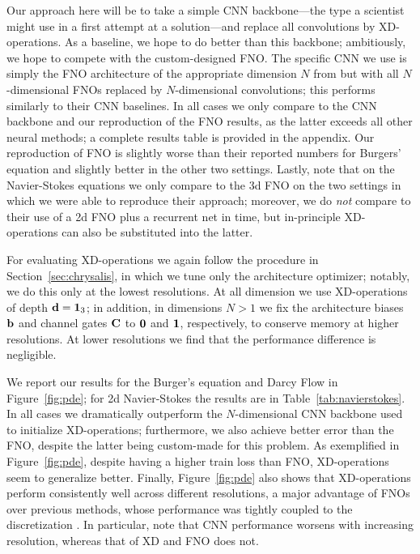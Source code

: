 
Our approach here will be to take a simple CNN backbone---the type a scientist might use in a first attempt at a solution---and replace all convolutions by XD-operations.
As a baseline, we hope to do better than this backbone;
ambitiously, we hope to compete with the custom-designed FNO.
The specific CNN we use is simply the FNO architecture of the appropriate dimension $N$ from \citet{li2021fno} but with all $N$-dimensional FNOs replaced by $N$-dimensional convolutions;
this performs similarly to their CNN baselines.
In all cases we only compare to the CNN backbone and our reproduction of the FNO results, as the latter exceeds all other neural methods;
a complete results table is provided in the appendix.
Our reproduction of FNO is slightly worse than their reported numbers for Burgers' equation and slightly better in the other two settings.
Lastly, note that on the Navier-Stokes equations we only compare to the 3d FNO on the two settings in which we were able to reproduce their approach;
moreover, we do {\em not} compare to their use of a 2d FNO plus a recurrent net in time, but in-principle XD-operations can also be substituted into the latter.

For evaluating XD-operations we again follow the procedure in Section~\ref{sec:chrysalis}, in which we tune only the architecture optimizer;
notably, we do this only at the lowest resolutions.
At all dimension we use XD-operations of depth $\mathbf{d}=\mathbf 1_3$;
in addition, in dimensions $N>1$ we fix the architecture biases $\mathbf{b}$ and channel gates $\mathbf{C}$ to $\mathbf 0$ and $\mathbf 1$, respectively, to conserve memory at higher resolutions.
At lower resolutions we find that the performance difference is negligible.

We report our results for the Burger's equation and Darcy Flow in Figure~\ref{fig:pde};
for 2d Navier-Stokes the results are in Table~\ref{tab:navierstokes}.
In all cases we dramatically outperform the $N$-dimensional CNN backbone used to initialize XD-operations;
furthermore, we also achieve better error than the FNO, despite the latter being custom-made for this problem.
As exemplified in Figure~\ref{fig:pde}, despite having a higher train loss than FNO, XD-operations seem to generalize better.
Finally, Figure~\ref{fig:pde} also shows that XD-operations perform consistently well across different resolutions, a major advantage of FNOs over previous methods, whose performance was tightly coupled to the discretization \citep{li2021fno}.
In particular, note that CNN performance worsens with increasing resolution, whereas that of XD and FNO does not.

